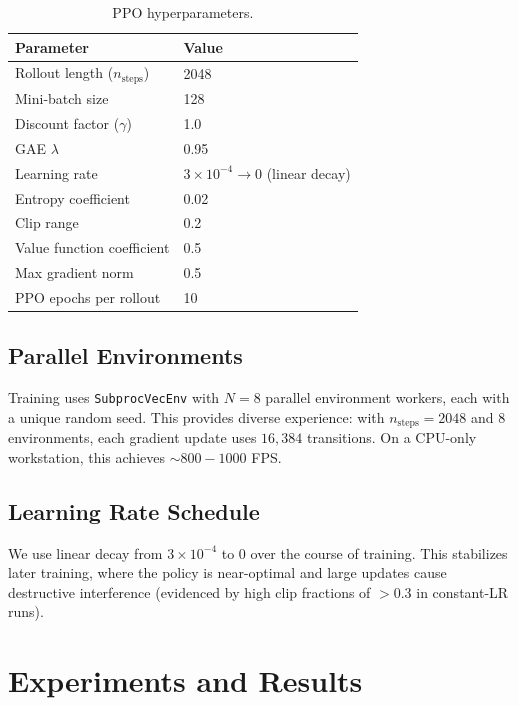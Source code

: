 \documentclass{article}
\begin{document}
\begin{table}[h]
\centering
\caption{PPO hyperparameters.}
\label{tab:ppo}
\begin{tabular}{@{}ll@{}}
\toprule
Parameter & Value \\
\midrule
Rollout length ($n_{\text{steps}}$) & 2048 \\
Mini-batch size & 128 \\
Discount factor ($\gamma$) & 1.0 \\
GAE $\lambda$ & 0.95 \\
Learning rate & $3 \times 10^{-4} \to 0$ (linear decay) \\
Entropy coefficient & 0.02 \\
Clip range & 0.2 \\
Value function coefficient & 0.5 \\
Max gradient norm & 0.5 \\
PPO epochs per rollout & 10 \\
\bottomrule
\end{tabular}
\end{table}

\subsection{Parallel Environments}

Training uses \texttt{SubprocVecEnv} with $N = 8$ parallel environment workers, each with a unique random seed. This provides diverse experience: with $n_{\text{steps}} = 2048$ and 8 environments, each gradient update uses $16{,}384$ transitions. On a CPU-only workstation, this achieves ${\sim}800{-}1000$ FPS.

\subsection{Learning Rate Schedule}

We use linear decay from $3 \times 10^{-4}$ to $0$ over the course of training. This stabilizes later training, where the policy is near-optimal and large updates cause destructive interference (evidenced by high clip fractions of $>0.3$ in constant-LR runs).

\section{Experiments and Results}
\end{document}
